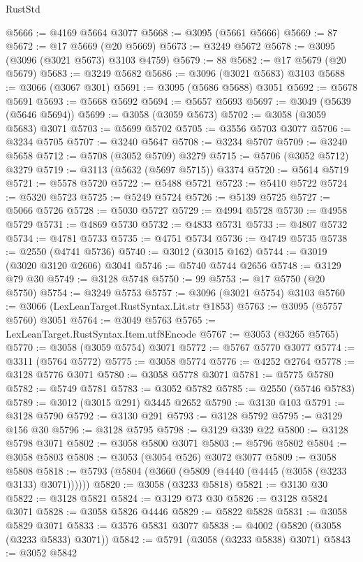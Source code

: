 \begin{lexlean}{RustStd}
\begin{coremodule}
@5666 := @4169 @5664 @3077
@5668 := @3095 (@5661 @5666)
@5669 := 87
@5672 := @17 @5669 (@20 @5669)
@5673 := @3249 @5672
@5678 := @3095 (@3096 (@3021 @5673) @3103 @4759)
@5679 := 88
@5682 := @17 @5679 (@20 @5679)
@5683 := @3249 @5682
@5686 := @3096 (@3021 @5683) @3103
@5688 := @3066 (@3067 @301)
@5691 := @3095 (@5686 @5688) @3051
@5692 := @5678 @5691
@5693 := @5668 @5692
@5694 := @5657 @5693
@5697 := @3049 (@5639 (@5646 @5694))
@5699 := @3058 (@3059 @5673)
@5702 := @3058 (@3059 @5683) @3071
@5703 := @5699 @5702
@5705 := @3556 @5703 @3077
@5706 := @3234 @5705
@5707 := @3240 @5647
@5708 := @3234 @5707
@5709 := @3240 @5658
@5712 := @5708 (@3052 @5709) @3279
@5715 := @5706 (@3052 @5712) @3279
@5719 := @3113 (@5632 (@5697 @5715)) @3374
@5720 := @5614 @5719
@5721 := @5578 @5720
@5722 := @5488 @5721
@5723 := @5410 @5722
@5724 := @5320 @5723
@5725 := @5249 @5724
@5726 := @5139 @5725
@5727 := @5066 @5726
@5728 := @5030 @5727
@5729 := @4994 @5728
@5730 := @4958 @5729
@5731 := @4869 @5730
@5732 := @4833 @5731
@5733 := @4807 @5732
@5734 := @4781 @5733
@5735 := @4751 @5734
@5736 := @4749 @5735
@5738 := @2550 (@4741 @5736)
@5740 := @3012 (@3015 @162)
@5744 := @3019 (@3020 @3120 @2606) @3041
@5746 := @5740 @5744 @2656
@5748 := @3129 @79 @30
@5749 := @3128 @5748
@5750 := 99
@5753 := @17 @5750 (@20 @5750)
@5754 := @3249 @5753
@5757 := @3096 (@3021 @5754) @3103
@5760 := @3066 (LexLeanTarget.RustSyntax.Lit.str @1853)
@5763 := @3095 (@5757 @5760) @3051
@5764 := @3049 @5763
@5765 := LexLeanTarget.RustSyntax.Item.utf8Encode
@5767 := @3053 (@3265 @5765)
@5770 := @3058 (@3059 @5754) @3071
@5772 := @5767 @5770 @3077
@5774 := @3311 (@5764 @5772)
@5775 := @3058 @5774
@5776 := @4252 @2764
@5778 := @3128 @5776 @3071
@5780 := @3058 @5778 @3071
@5781 := @5775 @5780
@5782 := @5749 @5781
@5783 := @3052 @5782
@5785 := @2550 (@5746 @5783)
@5789 := @3012 (@3015 @291) @3445 @2652
@5790 := @3130 @103
@5791 := @3128 @5790
@5792 := @3130 @291
@5793 := @3128 @5792
@5795 := @3129 @156 @30
@5796 := @3128 @5795
@5798 := @3129 @339 @22
@5800 := @3128 @5798 @3071
@5802 := @3058 @5800 @3071
@5803 := @5796 @5802
@5804 := @3058 @5803
@5808 := @3053 (@3054 @526) @3072 @3077
@5809 := @3058 @5808
@5818 := @5793 (@5804 (@3660 (@5809 (@4440 (@4445 (@3058 (@3233 @3133) @3071))))))
@5820 := @3058 (@3233 @5818)
@5821 := @3130 @30
@5822 := @3128 @5821
@5824 := @3129 @73 @30
@5826 := @3128 @5824 @3071
@5828 := @3058 @5826 @4446
@5829 := @5822 @5828
@5831 := @3058 @5829 @3071
@5833 := @3576 @5831 @3077
@5838 := @4002 (@5820 (@3058 (@3233 @5833) @3071))
@5842 := @5791 (@3058 (@3233 @5838) @3071)
@5843 := @3052 @5842

\end{coremodule}
\end{lexlean}
